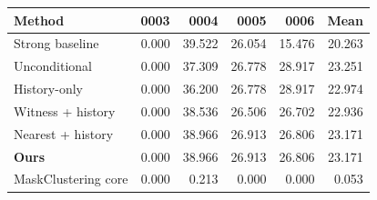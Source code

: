 \begin{tabular}{lrrrrr}
\toprule
Method & 0003 & 0004 & 0005 & 0006 & Mean \\
\midrule
Strong baseline & 0.000 & 39.522 & 26.054 & 15.476 & 20.263 \\
Unconditional & 0.000 & 37.309 & 26.778 & 28.917 & 23.251 \\
History-only & 0.000 & 36.200 & 26.778 & 28.917 & 22.974 \\
Witness + history & 0.000 & 38.536 & 26.506 & 26.702 & 22.936 \\
Nearest + history & 0.000 & 38.966 & 26.913 & 26.806 & 23.171 \\
\rowcolor{ourstint}
\textbf{Ours} & 0.000 & 38.966 & 26.913 & 26.806 & 23.171 \\
MaskClustering core & 0.000 & 0.213 & 0.000 & 0.000 & 0.053 \\
\bottomrule
\end{tabular}
